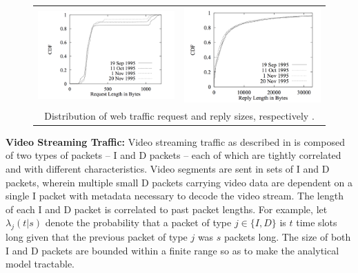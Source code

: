 \documentclass{llncs}
\begin{document}
\begin{figure}
\begin{center}
\begin{tabular}{cc}
\includegraphics[scale=0.3]{histogram1.png} & \includegraphics[scale=0.3]{histogram2.png} \\
\multicolumn{2}{c}{Distribution of web traffic request and reply sizes, respectively \cite{mah1997empirical}.}
\end{tabular}
\end{center}
\label{fig:histogram1}
\end{figure}

\noindent
\textbf{Video Streaming Traffic:} Video streaming traffic as described in \cite{badia2010markov} is composed of two types of packets -- I and D packets -- each of which are tightly correlated and with different characteristics. Video segments are sent in sets of I and D packets, wherein multiple small D packets carrying video data are dependent on a single I packet with metadata necessary to decode the video stream. The length of each I and D packet is correlated to past packet lengths. For example, let $\lambda_j(t|s)$ denote the probability that a packet of type $j \in \{I ,D \}$ is $t$ time slots long given that the previous packet of type $j$ was $s$ packets long. The size of both I and D packets are bounded within a finite range so as to make the analytical model tractable. 
\end{document}
